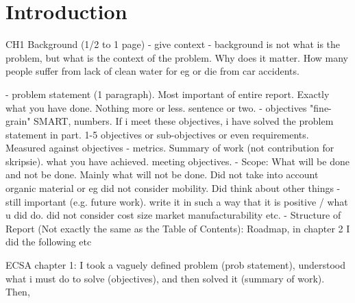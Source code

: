 \graphicspath{{introduction/fig/}}

\chapter{Introduction}
\label{chap:introduction}


CH1
 Background (1/2 to 1 page) - give context
- background is not what is the problem, but what is the context of the problem. Why does it matter. How many people suffer from lack of clean water for eg or die from car accidents. 

- problem statement (1 paragraph). Most important of entire report. Exactly what you have done. Nothing more or less. sentence or two. 
- objectives "fine-grain" SMART, numbers. If i meet these objectives, i have solved the problem statement in part. 1-5 objectives or sub-objectives or even requirements. Measured against objectives - metrics. 
Summary of work (not contribution for skripsie). what you have achieved. meeting objectives. 
- Scope: What will be done and not be done. Mainly what will not be done. Did not take into account organic material or eg did not consider mobility. Did think about other things - still important (e.g. future work). write it in such a way that it is positive  / what u did do. did not consider cost size market manufacturability etc. 
- Structure of Report (Not exactly the same as the Table of Contents): Roadmap, in chapter 2 I did the following etc

ECSA chapter 1: I took a vaguely defined problem (prob statement), understood what i must do to solve (objectives), and then solved it (summary of work).
Then, 




